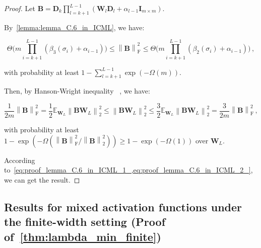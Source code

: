 \documentclass[nohyperref]{article}
\theoremstyle{plain}
\theoremstyle{definition}
\theoremstyle{remark}
\begin{document}
\begin{proof}

Let $\bm{B} = \bm{D}_{k}\prod_{l=k+1}^{L-1}(\bm{W}_l \bm{D}_{l}+\alpha_{l-1}\bm{I}_{m\times m})$.

By~\cref{lemma:lemma_C.6_in_ICML}, we have:

\begin{equation}
\Theta \bigg(m\prod_{i=k+1}^{L-1}(\beta_3(\sigma_i)+\alpha_{i-1} ) \bigg) \leq \left \| \bm{B} \right \|_{\mathrm{F}}^2 \leq \Theta \bigg(m\prod_{i=k+1}^{L-1}(\beta_2(\sigma_i)+\alpha_{i-1} )\bigg) \,,
\label{eq:proof_lemma_C.6_in_ICML_1_}
\end{equation}

with probability at least $1-\sum_{l=k+1}^{L-1}\exp(-\Omega (m))$.

Then, by Hanson-Wright inequality ~\citep{vershynin12}, we have:

\begin{equation}
\frac{1}{2m}\left \| \bm{B} \right \| _{\mathrm{F}}^2=\frac{1}{2}\mathbb{E}_{\bm{W}_L} \left \| \bm{B}\bm{W}_L \right \| _2^2 \leq \left \| \bm{B}\bm{W}_L \right \| _2^2 \leq \frac{3}{2}\mathbb{E}_{\bm{W}_L} \left \| \bm{B}\bm{W}_L \right \| _2^2 = \frac{3}{2m}\left \| \bm{B} \right \| _{\mathrm{F}}^2\,,
\label{eq:proof_lemma_C.6_in_ICML_2_}
\end{equation}

with probability at least $1-\exp(-\Omega (\left \| \bm{B} \right \|_{\mathrm{F}}^2/\left \| \bm{B} \right \|_2^2)) \geq 1-\exp(-\Omega (1))$ over $\bm{W}_L$.

According to~\cref{eq:proof_lemma_C.6_in_ICML_1_,eq:proof_lemma_C.6_in_ICML_2_}, we can get the result.

\end{proof}


\subsection{Results for mixed activation functions under the finite-width setting (Proof of~\cref{thm:lambda_min_finite})}
\label{ssec:Results_mixed_finitely_width}
\end{document}
